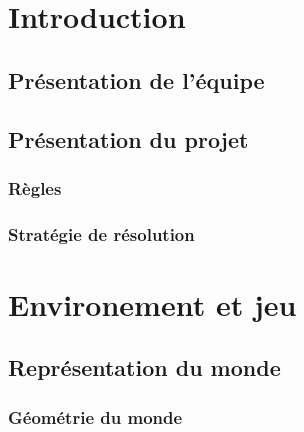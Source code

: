 \documentclass[10pt,a4paper,oneside]{report}
\begin{document}
\tableofcontents
\cleardoublepage



\chapter{Introduction}

\section{Présentation de l'équipe}

\section{Présentation du projet}
\subsection{Règles}
\subsection{Stratégie de résolution}


\chapter{Environement et jeu}

\section{Représentation du monde}
\subsection{Géométrie du monde}
\end{document}
